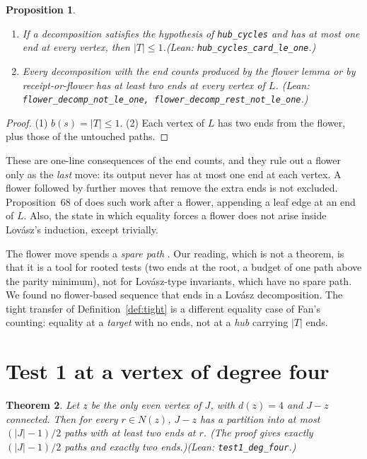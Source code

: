 \documentclass[11pt]{amsart}
\newtheorem{theorem}{Theorem}[section]
\newtheorem{proposition}[theorem]{Proposition}
\theoremstyle{definition}
\newcommand{\lean}[1]{\quad\emph{(Lean: \texttt{#1}.)}}
\begin{document}
\begin{proposition}\label{prop:noflower}
\begin{enumerate}
\item If a decomposition satisfies the hypothesis of \texttt{hub\_cycles} and has at most one end at
every vertex, then $|T|\le1$.\lean{hub\_cycles\_card\_le\_one}
\item Every decomposition with the end counts produced by the flower lemma or by receipt-or-flower
has at least two ends at every vertex of $L$.
\lean{flower\_decomp\_not\_le\_one, flower\_decomp\_rest\_not\_le\_one}
\end{enumerate}
\end{proposition}

\begin{proof}
(1) $b(s)=|T|\le1$. (2) Each vertex of $L$ has two ends from the flower, plus those of the untouched
paths.
\end{proof}

These are one-line consequences of the end counts, and they rule out a flower only as the
\emph{last} move: its output never has at most one end at each vertex. A flower followed by further
moves that remove the extra ends is not excluded. Proposition~68 of \cite{ES} does such work after a
flower, appending a leaf edge at an end of $L$. Also, the state in which equality forces a flower
does not arise inside Lov\'asz's induction, except trivially.

The flower move spends a \emph{spare path} \cite[\S7]{ES}. Our reading, which is not a theorem, is
that it is a tool for rooted tests (two ends at the root, a budget of one path above the parity
minimum), not for Lov\'asz-type invariants, which have no spare path. We found no flower-based
sequence that ends in a Lov\'asz decomposition. The tight transfer of Definition~\ref{def:tight} is
a different equality case of Fan's counting: equality at a \emph{target} with no ends, not at a
\emph{hub} carrying $|T|$ ends.

\section{Test 1 at a vertex of degree four}\label{sec:test1}

\begin{theorem}\label{thm:test1}
Let $z$ be the only even vertex of $J$, with $d(z)=4$ and $J-z$ connected. Then for every
$r\in N(z)$, $J-z$ has a partition into at most $(|J|-1)/2$ paths with at least two ends at $r$.
(The proof gives exactly $(|J|-1)/2$ paths and exactly two ends.)\lean{test1\_deg\_four}
\end{theorem}
\end{document}
